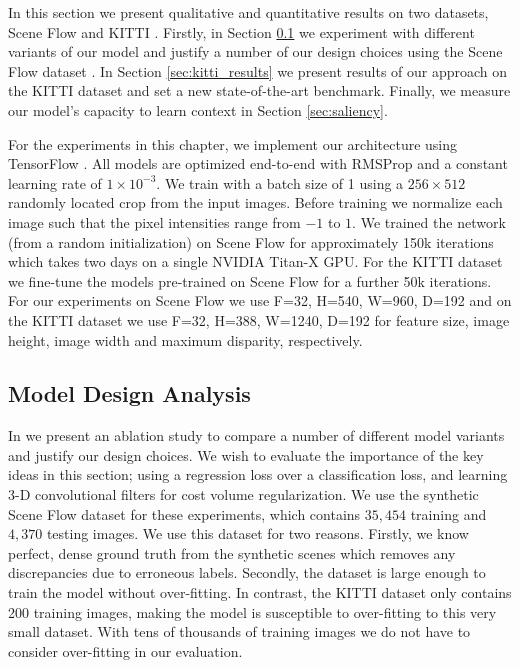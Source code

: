 In this section we present qualitative and quantitative results on two datasets, Scene Flow \citep{MIFDB16} and KITTI \citep{Geiger2012CVPR,Menze2015CVPR}. Firstly, in Section \ref{sec:model_results} we experiment with different variants of our model and justify a number of our design choices using the Scene Flow dataset \citep{MIFDB16}. In Section \ref{sec:kitti_results} we present results of our approach on the KITTI dataset and set a new state-of-the-art benchmark. Finally, we measure our model's capacity to learn context in Section \ref{sec:saliency}.

For the experiments in this chapter, we implement our architecture using TensorFlow \citep{abadi2016tensorflow}. All models are optimized end-to-end with RMSProp \citep{tieleman2012lecture} and a constant learning rate of $1 \times 10^{-3}$. We train with a batch size of 1 using a $256\times512$ randomly located crop from the input images. Before training we normalize each image such that the pixel intensities range from $-1$ to $1$. We trained the network (from a random initialization) on Scene Flow for approximately 150k iterations which takes two days on a single NVIDIA Titan-X GPU. For the KITTI dataset we fine-tune the models pre-trained on Scene Flow for a further 50k iterations. For our experiments on Scene Flow we use F=32, H=540, W=960, D=192 and on the KITTI dataset we use F=32, H=388, W=1240, D=192 for feature size, image height, image width and maximum disparity, respectively.

\subsection{Model Design Analysis}
\label{sec:model_results}

In  we present an ablation study to compare a number of different model variants and justify our design choices. We wish to evaluate the importance of the key ideas in this section; using a regression loss over a classification loss, and learning 3-D convolutional filters for cost volume regularization. We use the synthetic Scene Flow dataset \citep{MIFDB16} for these experiments, which contains $35,454$ training and $4,370$ testing images. We use this dataset for two reasons. Firstly, we know perfect, dense ground truth from the synthetic scenes which removes any discrepancies due to erroneous labels. Secondly, the dataset is large enough to train the model without over-fitting. In contrast, the KITTI dataset only contains 200 training images, making the model is susceptible to over-fitting to this very small dataset. With tens of thousands of training images we do not have to consider over-fitting in our evaluation.

